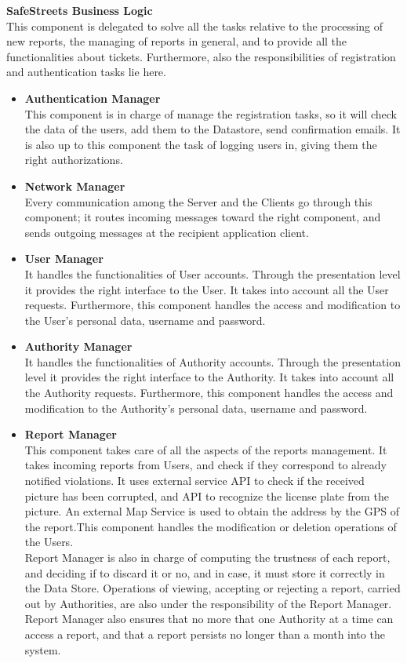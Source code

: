 \noindent\textbf{SafeStreets Business Logic}\\
This component is delegated to solve all the tasks relative to the processing of new reports, the managing of reports in general, and to provide all the functionalities about tickets.
Furthermore, also the responsibilities of registration and authentication tasks lie here. 
\begin{itemize}
    \item \textbf{Authentication Manager}\\
    This component is in charge of manage the registration tasks, so it will check the data of the users, add them to the Datastore, send confirmation emails. It is also up to this component the task of logging users in, giving them the right authorizations.  
    
    \item \textbf{Network Manager}\\
    Every communication among the Server and the Clients go through this component; it routes incoming messages toward the right component, and sends outgoing messages at the recipient application client.
    
    \item\textbf{User Manager}\\
    It handles the functionalities of User accounts. Through the presentation level it provides the right interface to the User. It takes into account all the User requests. Furthermore, this component handles the access and modification to the User's personal data, username and password. 
    
    
    \item\textbf{Authority Manager}\\
     It handles the functionalities of Authority accounts. Through the presentation level it provides the right interface to the Authority. It takes into account all the Authority requests. Furthermore, this component handles the access and modification to the Authority's personal data, username and password. 
     
     \item \textbf{Report Manager}\\
     This component takes care of all the aspects of the reports management.
     It takes incoming reports from Users, and check if they correspond to already notified violations. It uses external service API to check if the received picture has been corrupted, and API to recognize the license plate from the picture. An external Map Service is used to obtain the address by the GPS of the report.This component handles the modification or deletion operations of the Users.\\
     Report Manager is also in charge of computing the trustness of each report, and deciding if to discard it or no, and in case, it must store it correctly in the Data Store.
     Operations of viewing, accepting or rejecting a report, carried out by Authorities, are also under the responsibility of the Report Manager.
     Report Manager also ensures that no more that one Authority at a time can access a report, and that a report persists no longer than a month into the system.
     

\end{itemize}

